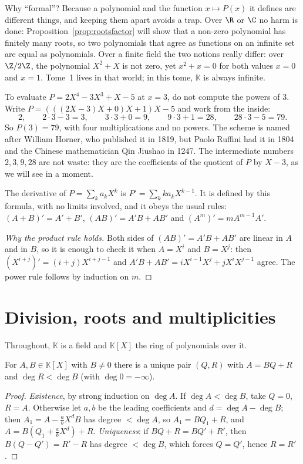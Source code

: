 Why ``formal''? Because a polynomial and the function $x\mapsto P(x)$ it defines are different things, and keeping them apart avoids a trap. Over
$\R$ or $\C$ no harm is done: Proposition~\ref{prop:rootsfactor} will show that a non-zero polynomial has finitely many roots, so two polynomials
that agree as functions on an infinite set are equal as polynomials. Over a finite field the two notions really differ: over $\Z/2\Z$, the polynomial
$X^2+X$ is not zero, yet $x^2+x=0$ for both values $x=0$ and $x=1$. Tome~1 lives in that world; in this tome, $\mathbb K$ is always infinite.

\begin{examplex}
To evaluate $P=2X^4-3X^3+X-5$ at $x=3$, do not compute the powers of $3$. Write $P=(((2X-3)X+0)X+1)X-5$ and work from the inside:
\[
2,\qquad 2\cdot3-3=3,\qquad 3\cdot3+0=9,\qquad 9\cdot3+1=28,\qquad 28\cdot3-5=79.
\]
So $P(3)=79$, with four multiplications and no powers. The scheme is named after William Horner, who published it in 1819, but Paolo Ruffini had
it in 1804 and the Chinese mathematician Qin Jiushao in 1247. The intermediate numbers $2,3,9,28$ are not waste: they are the coefficients of the
quotient of $P$ by $X-3$, as we will see in a moment.
\end{examplex}

\begin{definitionx}
The derivative of $P=\sum_ka_kX^k$ is $P'=\sum_kka_kX^{k-1}$. It is defined by this formula, with no limits involved, and it obeys the usual rules:
$(A+B)'=A'+B'$, $(AB)'=A'B+AB'$ and $(A^m)'=mA^{m-1}A'$.
\end{definitionx}
\begin{proof}[Why the product rule holds]
Both sides of $(AB)'=A'B+AB'$ are linear in $A$ and in $B$, so it is enough to check it when $A=X^i$ and $B=X^j$: then $(X^{i+j})'=(i+j)X^{i+j-1}$
and $A'B+AB'=iX^{i-1}X^j+jX^iX^{j-1}$ agree. The power rule follows by induction on $m$.
\end{proof}

\section{Division, roots and multiplicities}

Throughout, $\mathbb K$ is a field and $\mathbb K[X]$ the ring of polynomials over it.

\begin{proposition}\label{prop:polydiv}
For $A,B\in\mathbb K[X]$ with $B\ne0$ there is a unique pair $(Q,R)$ with $A=BQ+R$ and $\deg R<\deg B$ (with $\deg0=-\infty$).
\end{proposition}
\begin{proof}
\emph{Existence}, by strong induction on $\deg A$. If $\deg A<\deg B$, take $Q=0$, $R=A$. Otherwise let $a,b$ be the leading coefficients and $d=\deg A-\deg B$; then $A_1=A-\frac abX^dB$ has degree $<\deg A$, so $A_1=BQ_1+R$, and $A=B\left(Q_1+\frac abX^d\right)+R$.
\emph{Uniqueness}: if $BQ+R=BQ'+R'$, then $B(Q-Q')=R'-R$ has degree $<\deg B$, which forces $Q=Q'$, hence $R=R'$.
\end{proof}


